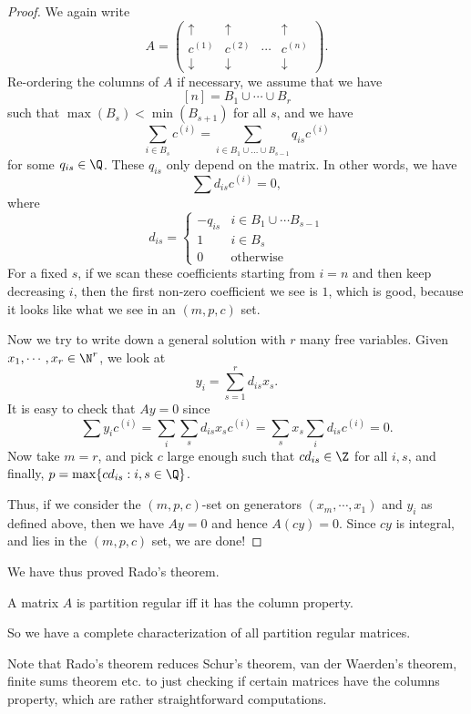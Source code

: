 \documentclass[a4paper]{article}
\begin{document}
\begin{proof}
  We again write
  \[
    A =
    \begin{pmatrix}
      \uparrow & \uparrow & & \uparrow\\
      c^{(1)} & c^{(2)} & \cdots & c^{(n)}\\
      \downarrow & \downarrow & & \downarrow
    \end{pmatrix}.
  \]
  Re-ordering the columns of $A$ if necessary, we assume that we have
  \[
    [n] = B_1 \cup \cdots \cup B_r
  \]
  such that $\max(B_s) < \min(B_{s + 1})$ for all $s$, and we have
  \[
    \sum_{i \in B_s} c^{(i)} = \sum_{i \in B_1 \cup \ldots \cup B_{s - 1}} q_{is}c^{(i)}
  \]
  for some $q_{is} \in \Q$. These $q_{is}$ only depend on the matrix. In other words, we have
  \[
    \sum d_{is} c^{(i)} = 0,
  \]
  where
  \[
    d_{is} =
    \begin{cases}
      -q_{is} & i \in B_1 \cup \cdots B_{s - 1}\\
      1 & i \in B_s\\
      0 & \text{otherwise}
    \end{cases}
  \]
  For a fixed $s$, if we scan these coefficients starting from $i = n$ and then keep decreasing $i$, then the first non-zero coefficient we see is $1$, which is good, because it looks like what we see in an $(m, p, c)$ set.

  Now we try to write down a general solution with $r$ many free variables. Given $x_1, \cdots, x_r \in \N^r$, we look at
  \[
    y_i = \sum_{s = 1}^r d_{is}x_s.
  \]
  It is easy to check that $Ay = 0$ since
  \[
    \sum y_i c^{(i)} = \sum_i \sum_s d_{is} x_s c^{(i)} = \sum_s x_s \sum_i d_{is} c^{(i)} = 0.
  \]
  Now take $m = r$, and pick $c$ large enough such that $c d_{is} \in \Z$ for all $i, s$, and finally, $p = \max \{c d_{is}: i, s \in \Q\}$.

  Thus, if we consider the $(m, p, c)$-set on generators $(x_m, \cdots, x_1)$ and $y_i$ as defined above, then we have $Ay = 0$ and hence $A(cy) = 0$. Since $cy$ is integral, and lies in the $(m, p, c)$ set, we are done!
\end{proof}

We have thus proved Rado's theorem.
\begin{thm}
  A matrix $A$ is partition regular iff it has the column property.
\end{thm}
So we have a complete characterization of all partition regular matrices.

Note that Rado's theorem reduces Schur's theorem, van der Waerden's theorem, finite sums theorem etc. to just checking if certain matrices have the columns property, which are rather straightforward computations.
\end{document}
